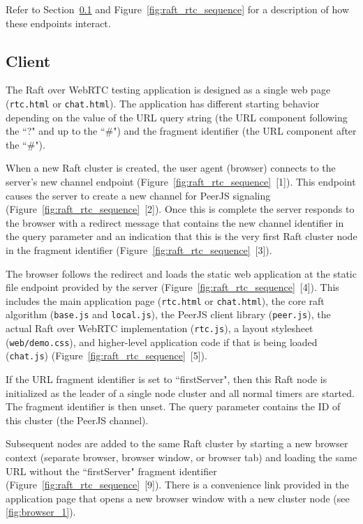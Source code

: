 \documentclass[conference,compsoc]{./IEEEtran/IEEEtran}
\begin{document}
Refer to Section~\ref{section:design-client} and
Figure~\ref{fig:raft_rtc_sequence} for a description of how these
endpoints interact.

\subsection{Client}
    \label{section:design-client}

The Raft over WebRTC testing application is designed as a single web
page (\texttt{rtc.html} or \texttt{chat.html}). The application has
different starting behavior depending on the value of the URL query
string (the URL component following the ``?" and up to the ``\#") and
the fragment identifier (the URL component after the ``\#").

When a new Raft cluster is created, the user agent (browser) connects
to the server's new channel endpoint
(Figure~\ref{fig:raft_rtc_sequence}~[1]). This endpoint causes the
server to create a new channel for PeerJS signaling
(Figure~\ref{fig:raft_rtc_sequence}~[2]). Once this is complete the
server responds to the browser with a redirect message
that contains the new channel identifier in the query parameter and an
indication that this is the very first Raft cluster node in the
fragment identifier (Figure~\ref{fig:raft_rtc_sequence}~[3]).

The browser follows the redirect and loads the static web application
at the static file endpoint provided by the server
(Figure~\ref{fig:raft_rtc_sequence}~[4]). This includes the
main application page (\texttt{rtc.html} or \texttt{chat.html}), the
core raft algorithm (\texttt{base.js} and \texttt{local.js}), the
PeerJS client library (\texttt{peer.js}), the actual Raft over WebRTC
implementation (\texttt{rtc.js}), a layout stylesheet
(\texttt{web/demo.css}), and higher-level application code if that is
being loaded (\texttt{chat.js})
(Figure~\ref{fig:raft_rtc_sequence}~[5]).

If the URL fragment identifier is set to ``firstServer", then this Raft
node is initialized as the leader of a single node cluster and all
normal timers are started. The fragment identifier is then unset. The
query parameter contains the ID of this cluster (the PeerJS channel).

Subsequent nodes are added to the same Raft cluster by starting a new
browser context (separate browser, browser window, or browser tab) and
loading the same URL without the ``firstServer" fragment identifier
(Figure~\ref{fig:raft_rtc_sequence}~[9]). There is a convenience link
provided in the application page that opens a new browser window with
a new cluster node (see \ref{fig:browser_1}).
\end{document}
